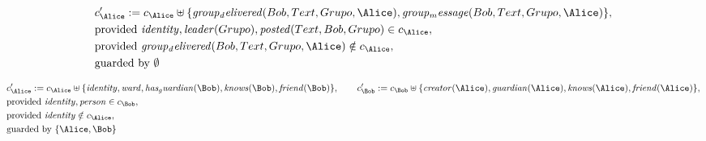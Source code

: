 \begin{align*}
&
c'_
{
\Alice
}
 := 
c_
{
\Alice
}
 \uplus 
\{
\mathit{
group_delivered
}
(
Bob
,
Text
,
Grupo
,
\Alice
)
,
\mathit{
group_message
}
(
Bob
,
Text
,
Grupo
,
\Alice
)
\}
,\\
&
\text{provided } 
\mathit{
identity
}
,
\mathit{
leader
}
(
Grupo
)
,
\mathit{
posted
}
(
Text
,
Bob
,
Grupo
)
 \in c_
{
\Alice
}
,\\
&
\text{provided } 
\mathit{
group_delivered
}
(
Bob
,
Text
,
Grupo
,
\Alice
)
 \notin c_
{
\Alice
}
,\\
&
\text{guarded by } \emptyset
\end{align*}

\begin{align*}
&
c'_
{
\Alice
}
 := 
c_
{
\Alice
}
 \uplus 
\{
\mathit{
identity
}
,
\mathit{
ward
}
,
\mathit{
has_guardian
}
(
\Bob
)
,
\mathit{
knows
}
(
\Bob
)
,
\mathit{
friend
}
(
\Bob
)
\}
, \qquad 
c'_
{
\Bob
}
 := 
c_
{
\Bob
}
 \uplus 
\{
\mathit{
creator
}
(
\Alice
)
,
\mathit{
guardian
}
(
\Alice
)
,
\mathit{
knows
}
(
\Alice
)
,
\mathit{
friend
}
(
\Alice
)
\}
,\\
&
\text{provided } 
\mathit{
identity
}
,
\mathit{
person
}
 \in c_
{
\Bob
}
,\\
&
\text{provided } 
\mathit{
identity
}
 \notin c_
{
\Alice
}
,\\
&
\text{guarded by } \{
\Alice
,
\Bob
\}
\end{align*}

